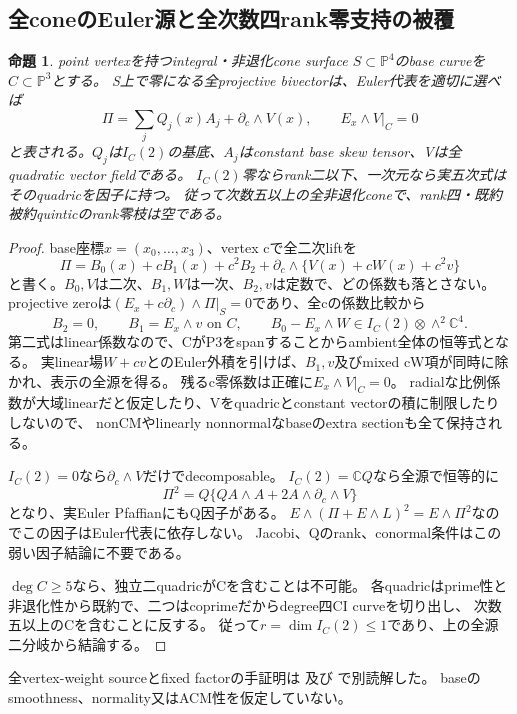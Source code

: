 \documentclass[a4paper,11pt]{ltjsarticle}
\newtheorem{proposition}{命題}[section]
\theoremstyle{definition}
\begin{document}
\subsection{全coneのEuler源と全次数四rank零支持の被覆}
\begin{proposition}\label{prop:rank-zero-cone-source}
point vertexを持つintegral・非退化cone surface $S\subset\mathbb P^4$のbase curveを$C\subset\mathbb P^3$とする。
S上で零になる全projective bivectorは、Euler代表を適切に選べば
\[
 \Pi=\sum_jQ_j(x)A_j+\partial_c\wedge V(x),\qquad E_x\wedge V|_C=0
\]
と表される。$Q_j$は$I_C(2)$の基底、$A_j$はconstant base skew tensor、Vは全quadratic vector fieldである。
$I_C(2)$零ならrank二以下、一次元なら実五次式はそのquadricを因子に持つ。
従って次数五以上の全非退化coneで、rank四・既約被約quinticのrank零枝は空である。
\end{proposition}
\begin{proof}
base座標$x=(x_0,\ldots,x_3)$、vertex cで全二次liftを
\[
 \Pi=B_0(x)+cB_1(x)+c^2B_2+
       \partial_c\wedge\{V(x)+cW(x)+c^2v\}
\]
と書く。$B_0,V$は二次、$B_1,W$は一次、$B_2,v$は定数で、どの係数も落とさない。
projective zeroは$(E_x+c\partial_c)\wedge\Pi|_S=0$であり、全cの係数比較から
\[
 B_2=0,\qquad B_1=E_x\wedge v\text{ on }C,\qquad
 B_0-E_x\wedge W\in I_C(2)\otimes\wedge^2\mathbb C^4.
\]
第二式はlinear係数なので、CがP3をspanすることからambient全体の恒等式となる。
実linear場$W+cv$とのEuler外積を引けば、$B_1,v$及びmixed cW項が同時に除かれ、表示の全源を得る。
残るc零係数は正確に$E_x\wedge V|_C=0$。
radialな比例係数が大域linearだと仮定したり、Vをquadricとconstant vectorの積に制限したりしないので、
nonCMやlinearly nonnormalなbaseのextra sectionも全て保持される。

$I_C(2)=0$なら$\partial_c\wedge V$だけでdecomposable。
$I_C(2)=\mathbb C Q$なら全源で恒等的に
\[
 \Pi^2=Q\{QA\wedge A+2A\wedge\partial_c\wedge V\}
\]
となり、実Euler PfaffianにもQ因子がある。
$E\wedge(\Pi+E\wedge L)^2=E\wedge\Pi^2$なのでこの因子はEuler代表に依存しない。
Jacobi、Qのrank、conormal条件はこの弱い因子結論に不要である。

$\deg C\ge5$なら、独立二quadricがCを含むことは不可能。
各quadricはprime性と非退化性から既約で、二つはcoprimeだからdegree四CI curveを切り出し、
次数五以上のCを含むことに反する。
従って$r=\dim I_C(2)\le1$であり、上の全源二分岐から結論する。
\end{proof}
全vertex-weight sourceとfixed factorの手証明は
及び
で別読解した。
baseのsmoothness、normality又はACM性を仮定していない。
\end{document}
